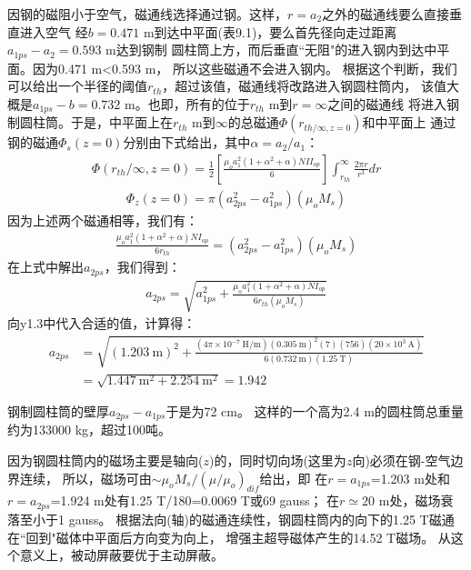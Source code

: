 因钢的磁阻小于空气，磁通线选择通过钢。这样，$r=a_2$之外的磁通线要么直接垂直进入空气
经$b=0.471$ m到达中平面(表9.1)，要么首先径向走过距离$a_{1ps}-a_2=0.593$ m达到钢制
圆柱筒上方，而后垂直``无阻"的进入钢内到达中平面。因为0.471 m<0.593 m，
所以这些磁通不会进入钢内。
根据这个判断，我们可以给出一个半径的阈值$r_{th}$，超过该值，磁通线将改路进入钢圆柱筒内，
该值大概是$a_{1ps}-b=0.732$ m。也即，所有的位于$r_{th}$ m到$r=\infty$之间的磁通线
将进入钢制圆柱筒。于是，中平面上在$r_{th}$ m到$\infty$的总磁通$\Phi(r_{th/\infty,z=0})$和中平面上
通过钢的磁通$\Phi_s(z=0)$分别由下式给出，其中$\alpha=a_2/a_1$：
\begin{align*}%
\Phi(r_{th}/\infty,z=0)=\frac{1}{2}[\frac{\mu_oa_1^2(1+\alpha^2+\alpha)NII_{op}}{6}]\int_{r_{th}}^{\infty}\frac{2\pi r}{r^3}dr \tag{y1.1a}
\end{align*}
\begin{align*}
\Phi_{z}(z=0)=\pi(a_{2ps}^2-a_{1ps}^2)(\mu_oM_s) \tag{y1.1b}
\end{align*}
因为上述两个磁通相等，我们有：
\begin{align*}%
\frac{\mu_oa_1^2(1+\alpha^2+\alpha)NI_{op}}{6r_{th}}=(a_{2ps}^2-a_{1ps}^2)(\mu_oM_s) \tag{y1.2}
\end{align*}
在上式中解出$a_{2ps}$，我们得到：
\begin{align*}%
a_{2ps}=\sqrt{a_{1ps}^2+\frac{\mu_oa_1^2(1+\alpha^2+\alpha)NI_{op}}{6r_{th}(\mu_oM_s)}} \tag{y1.3}
\end{align*}
向y1.3中代入合适的值，计算得：
\begin{align*}%
a_{2ps}&=\sqrt{(1.203\ \mathrm{m})^2+\frac{(4\pi\times 10^{-7}\ \mathrm{H/m})(0.305\ \mathrm{m})^2(7)(756)(20\times 10^3\ \mathrm{A})}{6(0.732\ \mathrm{m})(1.25\ \mathrm{T})}}\\
&=\sqrt{1.447\ \mathrm{m^2}+2.254\ \mathrm{m^2}}=1.942
\end{align*}

钢制圆柱筒的壁厚$a_{2ps}-a_{1ps}$于是为72 cm。
这样的一个高为2.4 m的圆柱筒总重量约为133000 kg，超过100吨。

因为钢圆柱筒内的磁场主要是轴向($z$)的，同时切向场(这里为$z$向)必须在钢-空气边界连续，
所以，磁场可由$\sim \mu_o M_s/(\mu/\mu_o)_{dif}$给出，即
在$r=a_{1ps}$=1.203 m处和$r=a_{2ps}$=1.924 m处有1.25 T/180=0.0069 T或69 gauss；
在$r\simeq 20$ m处，磁场衰落至小于1 gauss。
根据法向(轴)的磁通连续性，钢圆柱筒内的向下的1.25 T磁通在``回到"磁体中平面后方向变为向上，
增强主超导磁体产生的14.52 T磁场。
从这个意义上，被动屏蔽要优于主动屏蔽。

